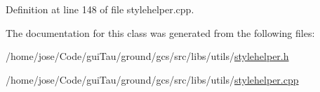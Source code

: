 Definition at line 148 of file stylehelper.\-cpp.



The documentation for this class was generated from the following files\-:\begin{DoxyCompactItemize}
\item 
/home/jose/\-Code/gui\-Tau/ground/gcs/src/libs/utils/\hyperlink{stylehelper_8h}{stylehelper.\-h}\item 
/home/jose/\-Code/gui\-Tau/ground/gcs/src/libs/utils/\hyperlink{stylehelper_8cpp}{stylehelper.\-cpp}\end{DoxyCompactItemize}
